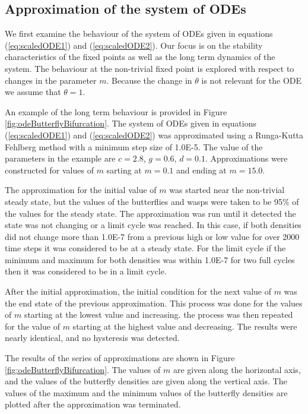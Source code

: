 \documentclass[12pt]{article}
\begin{document}
\subsection{Approximation of the system of ODEs}
\label{subsection:odeApproximation}

We first examine the behaviour of the system of ODEs given in
equations (\ref{eq:scaledODE1}) and (\ref{eq:scaledODE2}). Our focus
is on the stability characteristics of the fixed points as well as the
long term dynamics of the system. The behaviour at the non-trivial
fixed point is explored with respect to changes in the parameter
$m$. Because the change in $\theta$ is not relevant for the ODE we
assume that $\theta=1$.

An example of the long term behaviour is provided in Figure
\ref{fig:odeButterflyBifurcation}. The system of ODEs given in
equations (\ref{eq:scaledODE1}) and (\ref{eq:scaledODE2}) was
approximated using a Runga-Kutta Fehlberg method with a minimum step
size of 1.0E-5.  The value of the parameters in the example are
$c=2.8$, $g=0.6$, $d=0.1$. Approximations were constructed for values
of $m$ sarting at $m=0.1$ and ending at $m=15.0$.

The approximation for the initial value of $m$ was started near the
non-trivial steady state, but the values of the butterflies and wasps
were taken to be 95\% of the values for the steady state. The
approximation was run until it detected the state was not changing or
a limit cycle was reached. In this case, if both densities did not
change more than 1.0E-7 from a previous high or low value for over
2000 time steps it was considered to be at a steady state. For the
limit cycle if the minimum and maximum for both densities was within
1.0E-7 for two full cycles then it was considered to be in a limit
cycle.

After the initial approximation, the initial condition for the next
value of $m$ was the end state of the previous approximation. This
process was done for the values of $m$ starting at the lowest value
and increasing. the process was then repeated for the value of $m$
starting at the highest value and decreasing. The results were nearly
identical, and no hysteresis was detected.

The results of the series of approximations are shown in Figure
\ref{fig:odeButterflyBifurcation}. The values of $m$ are given along
the horizontal axis, and the values of the butterfly densities are
given along the vertical axis. The values of the maximum and the
minimum values of the butterfly densities are plotted after the
approximation was terminated.
\end{document}
